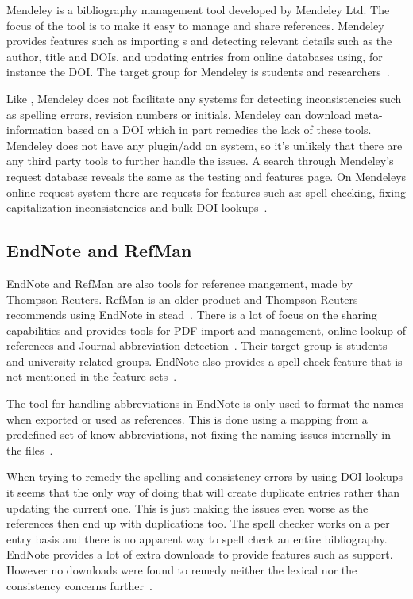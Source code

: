 Mendeley is a bibliography management tool developed by Mendeley Ltd.
The focus of the tool is to make it easy to manage and share
references.  Mendeley provides features such as importing s
and detecting relevant details such as the author, title and DOIs, and
updating entries from online databases using, for instance the DOI.
The target group for Mendeley is students and
researchers~\cite{mendeley_features}.

Like {\bibtex}, Mendeley does not facilitate any systems for detecting
inconsistencies such as spelling errors, revision numbers or initials.
Mendeley can download meta-information based on a DOI which in part
remedies the lack of these tools.  Mendeley does not have any
plugin/add on system, so it's unlikely that there are any third party
tools to further handle the {\bibtex} issues. A search through
Mendeley's request database reveals the same as the testing and
features page.  On Mendeleys online request system there are requests
for features such as: spell checking, fixing capitalization
inconsistencies and bulk DOI
lookups~\cite{mendeley_request_spellcheck, mendeley_request_lowercase,
  mendeley_request_capitalization, mendeley_request_bulk_doi}.

\subsection{EndNote and RefMan}
EndNote and RefMan are also tools for reference mangement, made by
Thompson Reuters.  RefMan is an older product and Thompson Reuters
recommends using EndNote in stead~\cite{refman_switch,
  refman_features}.  There is a lot of focus on the sharing
capabilities and provides tools for PDF import and management, online
lookup of references and Journal abbreviation
detection~\cite{endnote_basic_features, endnote_x7_features}.  Their
target group is students and university related groups.  EndNote also
provides a spell check feature that is not mentioned in the feature
sets~\cite{endnote_spellcheck}.

The tool for handling abbreviations in EndNote is only used to format
the names when exported or used as references.  This is done using a
mapping from a predefined set of know abbreviations, not fixing the
naming issues internally in the files~\cite{endnote_terms_journals}.

When trying to remedy the spelling and consistency errors by using DOI
lookups it seems that the only way of doing that will create duplicate
entries rather than updating the current one. This is just making the
issues even worse as the references then end up with duplications
too.  The spell checker works on a per entry basis and there is no
apparent way to spell check an entire bibliography.  EndNote provides
a lot of extra downloads to provide features such as {\bibtex}
support.  However no downloads were found to remedy neither the lexical
nor the consistency concerns further~\cite{endnote_downloads}.


